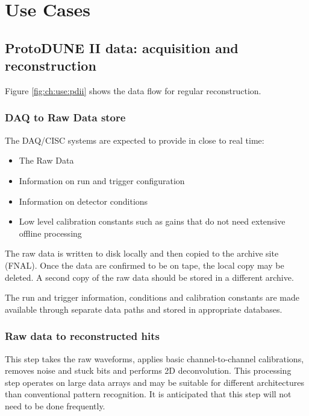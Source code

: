 \chapter{Use Cases}
\label{ch:use}



\section{ProtoDUNE II data: acquisition and reconstruction}\label{sec:use:pdii}

Figure \ref{fig:ch:use:pdii} shows the data flow for regular reconstruction.  

\subsection{DAQ to Raw Data store}
The DAQ/CISC systems are expected to provide in close to real time:

\begin{itemize}
    \item The Raw Data
    \item Information on run and trigger configuration
    \item Information on detector conditions
    \item Low level calibration constants such as gains that do not need extensive offline processing
    
\end{itemize}

The raw data is written to disk locally and then copied to the archive site (FNAL). Once the data are confirmed to be on tape, the local copy may be deleted.
A second copy of the raw data should be stored in a different archive. 

The run and trigger information, conditions and calibration constants are made available through separate data paths and stored in appropriate databases.  

\subsection{Raw data to reconstructed hits}

This step takes the raw waveforms, applies  basic channel-to-channel calibrations, removes noise and stuck bits and performs 2D deconvolution.   This processing step operates on large data arrays and may be suitable for different architectures than conventional pattern recognition. It is anticipated that this step will not need to be done frequently. 

